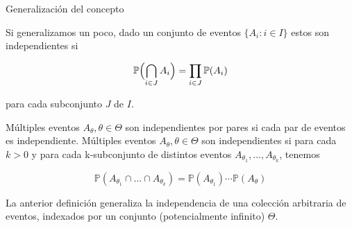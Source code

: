 \documentclass[10pt]{beamer}
\begin{document}
\begin{frame}{Generalizaci\'on del concepto }	
\small{Si generalizamos un poco, dado un conjunto  de eventos $\{ A_i: i \in I \}$ estos  son independientes si
	
\[
	\mathbb{P}\Bigl(  \bigcap\limits_{i \in J}A_i \Bigr)  = \prod_{i \in J}\mathbb{P}(A_i)  
\]
	
para cada subconjunto $J$ de $I$.

\vspace{0.2cm}





 M\'ultiples eventos $A_{\theta}, \theta \in \Theta$ son independientes por pares si cada par de eventos es independiente.  M\'ultiples eventos $A_{\theta}, \theta \in \Theta$ son independientes si para cada $k > 0$ y para cada k-subconjunto de distintos eventos $A_{\theta_1},\ldots,A_{\theta_k}$, tenemos}
	
	\[
	\mathbb{P}(A_{\theta_1}\cap\ldots\cap A_{\theta_k})=\mathbb{P}(A_{\theta_1})\cdots \mathbb{P}(A_{\theta})
	\]

\vspace{0.2cm}

\scriptsize{La anterior definici\'on generaliza la independencia de una colecci\'on arbitraria de eventos, indexados por un conjunto (potencialmente infinito) $\Theta$.}
\end{frame}
\end{document}
